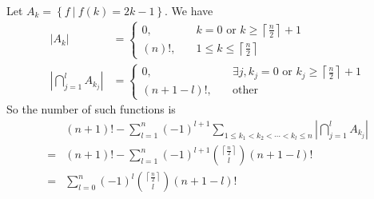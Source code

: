 \documentclass{article}
\begin{document}
Let $A_k = \left\{f\ |\ f(k) = 2k - 1\right\}$. We have
\begin{align*}
    \left\lvert A_k\right\rvert &= \begin{cases}
        0, &\quad k = 0 \text{ or }k \geqslant \left\lceil \frac{n}{2}\right\rceil + 1 \\
        (n)!, &\quad 1 \leqslant k \leqslant \left\lceil \frac{n}{2}\right\rceil 
    \end{cases} \\
    \left\lvert \bigcap_{j = 1}^{l}A_{k_j}\right\rvert &= \begin{cases}
        0, &\quad \exists j, k_j = 0 \text{ or } k_j \geqslant \left\lceil \frac{n}{2}\right\rceil + 1 \\
        (n + 1 - l)!, &\quad \text{other}
    \end{cases}
\end{align*}
So the number of such functions is
\begin{align*}
    &(n + 1)! - \sum_{l = 1}^{n}(-1)^{l + 1}\sum_{1 \leqslant k_1 < k_2 < \cdots < k_l \leqslant n}\left\lvert \bigcap_{j = 1}^{l}A_{k_j}\right\rvert \\
    =& (n + 1)! - \sum_{l = 1}^{n}(-1)^{l + 1}\binom{\left\lceil \frac{n}{2}\right\rceil}{l}(n + 1 - l)! \\
    =& \sum_{l = 0}^{n}(-1)^l\binom{\left\lceil \frac{n}{2}\right\rceil}{l}(n + 1 - l)!  
\end{align*}
\end{document}
